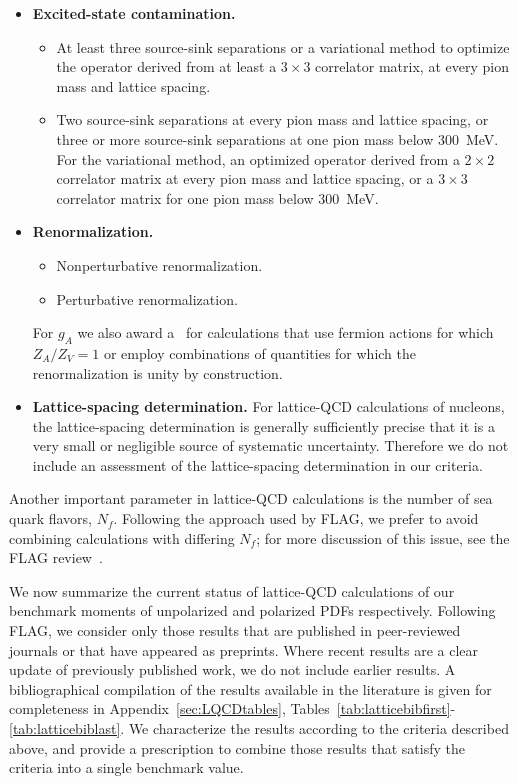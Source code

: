 \begin{itemize}
\item {\bfseries Excited-state contamination.}
%
\begin{itemize}
%
\item[\bstar] At least three source-sink separations or a variational method 
to optimize the operator derived from at least a $3\times 3$ correlator matrix, 
at every pion mass and lattice spacing.
% 
\item[\bcirc] Two source-sink separations at every pion mass and lattice 
spacing, or three or more source-sink separations at one pion mass below 
300~MeV.
%
For the variational method, an optimized operator derived from a $2\times 2$ 
correlator matrix at every pion mass and lattice spacing, or a $3\times 3$ 
correlator matrix for one pion mass below 300~MeV.
%
\end{itemize}

\item {\bfseries Renormalization.}
\begin{itemize}
%
\item[\bstar] Nonperturbative renormalization.
%
\item[\bcirc] Perturbative renormalization.
%
\end{itemize}
%
For $g_A$ we also award a \bstar~for calculations that use fermion actions 
for which $Z_A/Z_V=1$ or employ combinations of quantities for which the 
renormalization is unity by construction.

\item {\bfseries Lattice-spacing determination.}
For lattice-QCD calculations of nucleons, the lattice-spacing determination is 
generally sufficiently precise that it is a very small or negligible source
of systematic uncertainty. 
%
Therefore we do not include an assessment of the lattice-spacing
determination in our criteria.

\end{itemize}

Another important parameter in lattice-QCD calculations is the number of sea 
quark flavors, $N_f$. 
%
Following the approach used by FLAG, we prefer to avoid combining calculations 
with differing $N_f$; for more discussion of this issue, see the FLAG 
review~\cite{Aoki:2016frl}.

We now summarize the current status of lattice-QCD calculations of
our benchmark moments of unpolarized and polarized PDFs respectively.
%
Following FLAG, we consider only those results that are published in 
peer-reviewed journals or that have appeared as preprints. 
%
Where recent results are a clear update of previously published work, we do 
not include earlier results.
%
A bibliographical compilation of the results available in the literature 
is given for completeness in Appendix~\ref{sec:LQCDtables},
Tables~\ref{tab:latticebibfirst}-\ref{tab:latticebiblast}.
%
We characterize the results according to the criteria 
described above, and provide a prescription to combine those results that 
satisfy the criteria into a single benchmark value.

